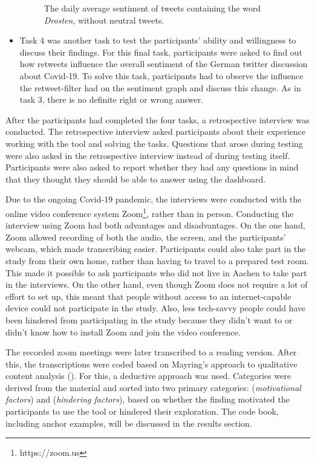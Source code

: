 \begin{itemize}
\begin{figure}[h!tb]
        \caption{The daily average sentiment of tweets containing the word \emph{Drosten}, without neutral tweets.}
        \label{fig:sentiment_drosten_noneutral}
    \end{figure}
    \item Task 4 was another task to test the participants' ability and willingness to discuss their findings.
    For this final task, participants were asked to find out how retweets influence the overall sentiment of the German twitter discussion about Covid-19. To solve this task, participants had to observe the influence the retweet-filter had on the sentiment graph and discuss this change. As in task 3, there is no definite right or wrong answer.
\end{itemize}

After the participants had completed the four tasks, a retrospective interview was conducted. The retrospective interview asked participants about their experience working with the tool and solving the tasks. Questions that arose during testing were also asked in the retrospective interview instead of during testing itself. Participants were also asked to report whether they had any questions in mind that they thought they should be able to answer using the dashboard.

Due to the ongoing Covid-19 pandemic, the interviews were conducted with the online video conference system Zoom\footnote{https://zoom.us}, rather than in person. Conducting the interview using Zoom had both advantages and disadvantages. On the one hand, Zoom allowed recording of both the audio, the screen, and the participants' webcam, which made transcribing easier. Participants could also take part in the study from their own home, rather than having to travel to a prepared test room. This made it possible to ask participants who did not live in Aachen to take part in the interviews.
On the other hand, even though Zoom does not require a lot of effort to set up, this meant that people without access to an internet-capable device could not participate in the study. Also, less tech-savvy people could have been hindered from participating in the study because they didn't want to or didn't know how to install Zoom and join the video conference.

The recorded zoom meetings were later transcribed to a reading version. After this, the transcriptions were coded based on Mayring's approach to qualitative content analysis (\cite{mayring2010qualitative}). For this, a deductive approach was used. Categories were derived from the material and sorted into two primary categories:  (\emph{motivational factors}) and  (\emph{hindering factors}), based on whether the finding motivated the participants to use the tool or hindered their exploration. The code book, including anchor examples, will be discussed in the results section. 

